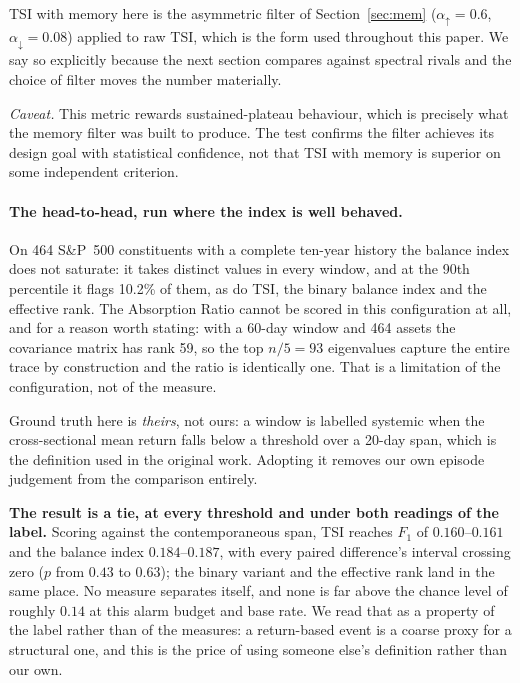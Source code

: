 \documentclass[11pt,a4paper]{article}
\begin{document}
TSI with memory here is the asymmetric filter of Section~\ref{sec:mem}
($\alpha_{\uparrow} = 0.6$, $\alpha_{\downarrow} = 0.08$) applied to raw
TSI, which is the form used throughout this paper. We say so explicitly
because the next section compares against spectral rivals and the choice of
filter moves the number materially.

\emph{Caveat.} This metric rewards sustained-plateau behaviour, which is
precisely what the memory filter was built to produce. The test confirms the
filter achieves its design goal with statistical confidence, not that
TSI with memory is superior on some independent criterion.


\paragraph{The head-to-head, run where the index is well behaved.} On 464
S\&P~500 constituents with a complete ten-year history the balance index does
not saturate: it takes distinct values in every window, and at the 90th
percentile it flags 10.2\% of them, as do TSI, the binary balance index and
the effective rank. The Absorption Ratio cannot be scored in this
configuration at all, and for a reason worth stating: with a 60-day window and
464 assets the covariance matrix has rank 59, so the top $n/5 = 93$ eigenvalues
capture the entire trace by construction and the ratio is identically one. That
is a limitation of the configuration, not of the measure.

Ground truth here is \emph{theirs}, not ours: a window is labelled systemic when
the cross-sectional mean return falls below a threshold over a 20-day span,
which is the definition used in the original work. Adopting it removes our own
episode judgement from the comparison entirely.

\textbf{The result is a tie, at every threshold and under both readings of the
label.} Scoring against the contemporaneous span, TSI reaches $F_1$ of
$0.160$--$0.161$ and the balance index $0.184$--$0.187$, with every paired
difference's interval crossing zero ($p$ from $0.43$ to $0.63$); the binary
variant and the effective rank land in the same place. No measure separates
itself, and none is far above the chance level of roughly $0.14$ at this alarm
budget and base rate. We read that as a property of the label rather than of the
measures: a return-based event is a coarse proxy for a structural one, and this
is the price of using someone else's definition rather than our own.
\end{document}
